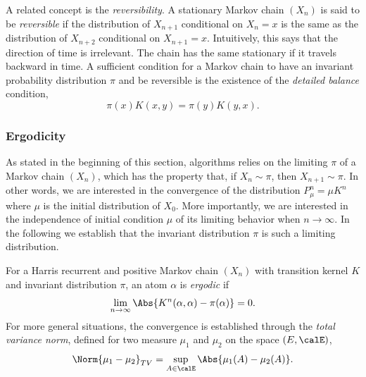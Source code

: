 A related concept is the \emph{reversibility}. A stationary Markov chain
$(X_n)$ is said to be \emph{reversible} if the distribution of $X_{n+1}$
conditional on $X_n = x$ is the same as the distribution of $X_{n+2}$
conditional on $X_{n+1} = x$. Intuitively, this says that the direction of
time is irrelevant. The chain has the same stationary if it travels backward
in time. A sufficient condition for a Markov chain to have an invariant
probability distribution $\pi$ and be reversible is the existence of the
\emph{detailed balance} condition,
\begin{equation}
  \pi(x)K(x,y) = \pi(y)K(y,x).
\end{equation}

\subsubsection{Ergodicity}
\label{ssub:Ergodicity}

As stated in the beginning of this section, \mcmc algorithms relies on the
limiting $\pi$ of a Markov chain $(X_n)$, which has the property that, if
$X_n\sim\pi$, then $X_{n+1}\sim\pi$. In other words, we are interested in the
convergence of the distribution $P_{\mu}^n = \mu K^n$ where $\mu$ is the
initial distribution of $X_0$. More importantly, we are interested in the
independence of initial condition $\mu$ of its limiting behavior when
$n\to\infty$. In the following we establish that the invariant distribution
$\pi$ is such a limiting distribution.

For a Harris recurrent and positive Markov chain $(X_n)$ with transition
kernel $K$ and invariant distribution $\pi$, an atom $\alpha$ is
\emph{ergodic} if
\begin{equation}
  \lim_{n\to\infty}\Abs{K^n(\alpha,\alpha) - \pi(\alpha)} = 0.
\end{equation}
For more general situations, the convergence is established through the
\emph{total variance norm}, defined for two measure $\mu_1$ and $\mu_2$ on the
space $(E,\calE)$,
\begin{equation}
  \Norm{\mu_1-\mu_2}_{TV} = \sup_{A\in\calE}\Abs{\mu_1(A) - \mu_2(A)}.
\end{equation}

